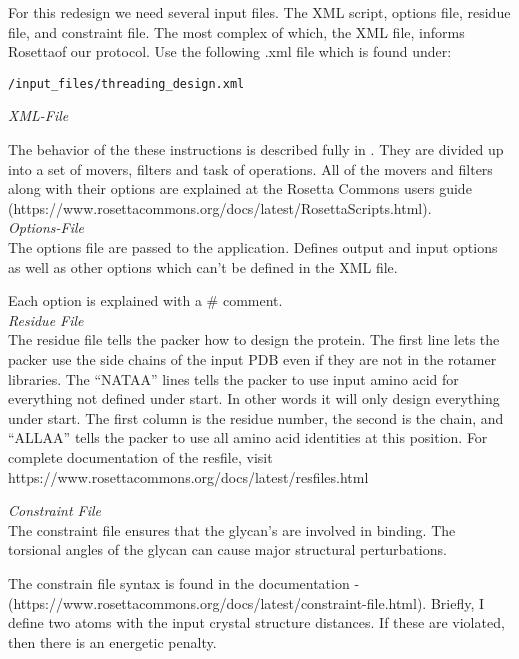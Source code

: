 For this redesign we need several input files. The XML script, options file, residue file, and constraint file. The most complex of which, the XML file, informs Rosettaof our protocol. Use the following .xml file which is found under:

\begin{verbatim}
/input_files/threading_design.xml
\end{verbatim}

\textit{XML-File}



The behavior of the these instructions is described fully in \citep{Fleishman:2011ji}. They are divided up into a set of movers, filters and task of operations. All of the movers and filters along with their options are explained at the Rosetta Commons users guide (https://www.rosettacommons.org/docs/latest/RosettaScripts.html). \\

\textit{Options-File}\\
The options file are passed to the application. Defines output and input options as well as other options which can't be defined in the XML file.


Each option is explained with a \# comment.\\

\textit{Residue File}\\
The residue file tells the packer how to design the protein. The first line lets the packer use the side chains of the input PDB even if they are not in the rotamer libraries. The ``NATAA'' lines tells the packer to use input amino acid for everything not defined under start. In other words it will only design everything under start. The first column is the residue number, the second is the chain, and ``ALLAA'' tells the packer to use all amino acid identities at this position. For complete documentation of the resfile, visit https://www.rosettacommons.org/docs/latest/resfiles.html



\textit{Constraint File} \\
The constraint file ensures that the glycan's are involved in binding. The torsional angles of the glycan can cause major structural perturbations.


The constrain file syntax is found in the documentation - \\(https://www.rosettacommons.org/docs/latest/constraint-file.html). Briefly, I define two atoms with the input crystal structure distances. If these are violated, then there is an energetic penalty. \\

